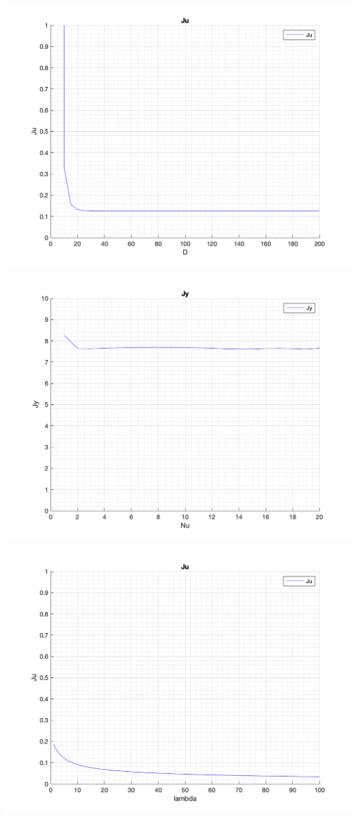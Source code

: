 \documentclass[a4paper, 11pt]{article}
\begin{document}
\begin{enumerate}
 \includegraphics[width=\linewidth]{./ModelsP4_J/JuD.png} 
 
 \includegraphics[width=\linewidth]{./ModelsP4_J/JyNu.png} 
 
 \includegraphics[width=\linewidth]{./ModelsP4_J/Julambda.png} 
 

\end{enumerate}
\end{document}
